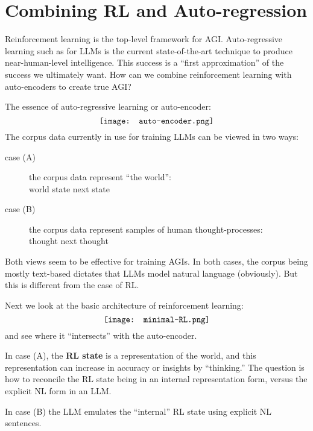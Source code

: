 \chapter{Combining RL and Auto-regression}
\label{chap:RL-Autoregression}

Reinforcement learning is the top-level framework for AGI.  Auto-regressive learning such as for LLMs is the current state-of-the-art technique to produce near-human-level intelligence.  This success is a ``first approximation'' of the success we ultimately want.  How can we combine reinforcement learning with auto-encoders to create true AGI?

The essence of auto-regressive learning or auto-encoder:
\begin{equation}
	\vcenter{\hbox{\texttt{[image: auto-encoder.png]}}}
\end{equation}
The corpus data currently in use for training LLMs can be viewed in two ways:
\begin{description}
	\item[\hspace{2em} case (A)] the corpus data represent ``the world'': \\
	world state \autoencoder next state
	\item[\hspace{2em} case (B)] the corpus data represent samples of human thought-processes: \\
	thought \autoencoder next thought
\end{description}
Both views seem to be effective for training AGIs.  In both cases, the corpus being mostly text-based dictates that LLMs model natural language (obviously).  But this is different from the case of RL.

Next we look at the basic architecture of reinforcement learning:
\begin{equation}
\vcenter{\hbox{\texttt{[image: minimal-RL.png]}}}
\end{equation}
and see where it ``intersects'' with the auto-encoder.

In case (A), the \textbf{RL state} is a representation of the world, and this representation can increase in accuracy or insights by ``thinking.''  The question is how to reconcile the RL state being in an internal representation form, versus the explicit NL form in an LLM.  

In case (B) the LLM emulates the ``internal'' RL state using explicit NL sentences.

